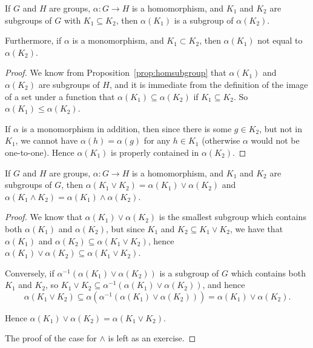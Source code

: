 \begin{proposition}\label{prop:homsubgrouporderpreserving}
  If $G$ and $H$ are groups, $\alpha : G \to H$ is a homomorphism, and $K_{1}$
  and $K_{2}$ are subgroups of $G$ with $K_{1} \subseteq K_{2}$, then
  $\alpha(K_{1})$ is a subgroup of $\alpha(K_{2})$.
  
  Furthermore, if $\alpha$ is a monomorphism, and $K_{1} \subset K_{2}$,
  then $\alpha(K_{1})$ not equal to $\alpha(K_{2})$.
\end{proposition}
\begin{proof}
  We know from Proposition~\ref{prop:homsubgroup} that $\alpha(K_{1})$ and
  $\alpha(K_{2})$ are subgroups of $H$, and it is immediate from the
  definition of the image of a set under a function that $\alpha(K_{1}) 
  \subseteq \alpha(K_{2})$ if $K_{1} \subseteq K_{2}$.  So $\alpha(K_{1}) 
  \le \alpha(K_{2})$.
  
  If $\alpha$ is a monomorphism in addition, then since there is some $g \in
  K_{2}$, but not in $K_{1}$, we cannot have $\alpha(h) = \alpha(g)$ for any
  $h \in K_{1}$ (otherwise $\alpha$ would not be one-to-one).  Hence
  $\alpha(K_{1})$ is properly contained in $\alpha(K_{2})$.
\end{proof}

\begin{corollary}\label{cor:hommeetandjoin}
  If $G$ and $H$ are groups, $\alpha : G \to H$ is a homomorphism, and $K_{1}$
  and $K_{2}$ are subgroups of $G$, then $\alpha(K_{1} \vee K_{2}) =
  \alpha(K_{1}) \vee \alpha(K_{2})$ and $\alpha(K_{1} \wedge K_{2}) =
  \alpha(K_{1}) \wedge \alpha(K_{2})$.
\end{corollary}
\begin{proof}
  We know that $\alpha(K_{1}) \vee \alpha(K_{2})$ is the smallest
  subgroup which contains both $\alpha(K_{1})$ and $\alpha(K_{2})$, but
  since $K_{1}$ and $K_{2} \subseteq K_{1} \vee K_{2}$, we have that
  $\alpha(K_{1})$ and $\alpha(K_{2}) \subseteq \alpha(K_{1} \vee K_{2})$,
  hence $\alpha(K_{1}) \vee \alpha(K_{2}) \subseteq \alpha(K_{1} \vee
  K_{2})$.

  Conversely, if $\alpha^{-1}(\alpha(K_{1}) \vee \alpha(K_{2}))$ is a
  subgroup of $G$ which contains both $K_{1}$ and $K_{2}$, so $K_{1} \vee
  K_{2} \subseteq \alpha^{-1}(\alpha(K_{1}) \vee \alpha(K_{2}))$, and hence
  \[
    \alpha(K_{1} \vee K_{2}) \subseteq \alpha(\alpha^{-1}(\alpha(K_{1}) \vee
    \alpha(K_{2}))) = \alpha(K_{1}) \vee \alpha(K_{2}).
  \]
  
  Hence $\alpha(K_{1}) \vee \alpha(K_{2}) = \alpha(K_{1} \vee K_{2})$.
  
  The proof of the case for $\wedge$ is left as an exercise.
\end{proof}

